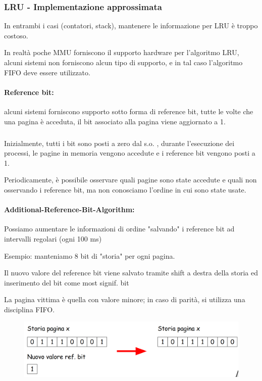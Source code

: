 \subsubsection{LRU - Implementazione approssimata}
In entrambi i casi (contatori, stack), mantenere le informazione per LRU è troppo costoso.

In realtà poche MMU forniscono il supporto hardware per l'algoritmo LRU, alcuni sistemi non forniscono alcun tipo di supporto, e in tal caso l'algoritmo FIFO deve essere utilizzato.

\paragraph{Reference bit:} alcuni sistemi forniscono supporto sotto forma di reference bit, tutte le volte che una pagina è acceduta, il bit associato alla pagina viene aggiornato a 1.
\subparagraph{}
Inizialmente, tutti i bit sono posti a zero dal s.o. , durante l'esecuzione dei processi, le pagine in memoria vengono
accedute e i reference bit vengono posti a 1.

Periodicamente, è possibile osservare quali pagine sono state
accedute e quali non osservando i reference bit, ma non conosciamo l'ordine in cui sono state usate.

\paragraph{Additional-Reference-Bit-Algorithm:}
Possiamo aumentare le informazioni di ordine "salvando" i reference bit ad intervalli regolari (ogni 100 ms)

Esempio: manteniamo 8 bit di "storia" per ogni pagina.

Il nuovo valore del reference bit viene salvato tramite shift a destra della storia ed inserimento del bit come most signif. bit

La pagina vittima è quella con valore minore; in caso di parità, si utilizza una disciplina FIFO.

\begin{figure} [h]
    \centering
    \includegraphics[width=0.7\linewidth]{Images/Screenshot 2025-01-17 at 18-15-39 so-05-memoria - so-05-memoria.pdf.png}
\end{figure}
\newpage

